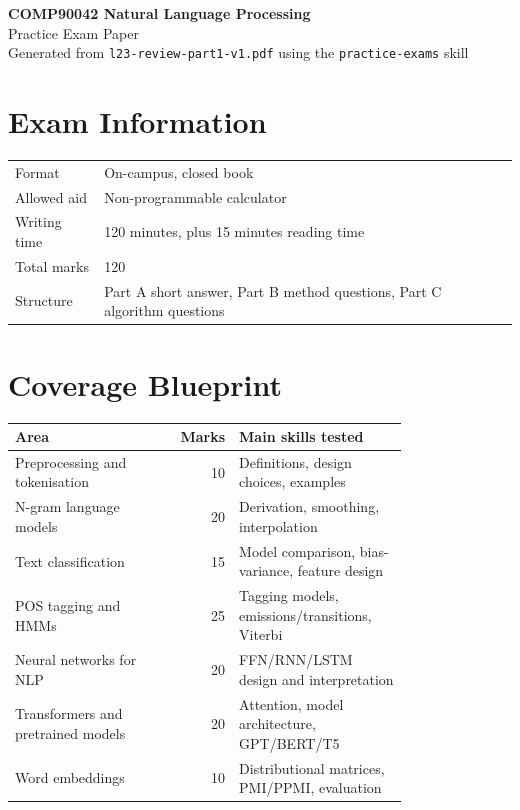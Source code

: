 \documentclass[11pt,a4paper]{article}
\begin{document}
\begin{center}
{\Large \textbf{COMP90042 Natural Language Processing}}\\
{\large Practice Exam Paper}\\[0.4em]
Generated from \texttt{l23-review-part1-v1.pdf} using the \texttt{practice-exams} skill
\end{center}

\section*{Exam Information}

\begin{tabular}{@{}ll@{}}
\toprule
Format & On-campus, closed book \\
Allowed aid & Non-programmable calculator \\
Writing time & 120 minutes, plus 15 minutes reading time \\
Total marks & 120 \\
Structure & Part A short answer, Part B method questions, Part C algorithm questions \\
\bottomrule
\end{tabular}

\section*{Coverage Blueprint}

\begin{tabular}{@{}p{0.35\linewidth}r p{0.43\linewidth}@{}}
\toprule
\textbf{Area} & \textbf{Marks} & \textbf{Main skills tested} \\
\midrule
Preprocessing and tokenisation & 10 & Definitions, design choices, examples \\
N-gram language models & 20 & Derivation, smoothing, interpolation \\
Text classification & 15 & Model comparison, bias-variance, feature design \\
POS tagging and HMMs & 25 & Tagging models, emissions/transitions, Viterbi \\
Neural networks for NLP & 20 & FFN/RNN/LSTM design and interpretation \\
Transformers and pretrained models & 20 & Attention, model architecture, GPT/BERT/T5 \\
Word embeddings & 10 & Distributional matrices, PMI/PPMI, evaluation \\
\bottomrule
\end{tabular}
\end{document}

